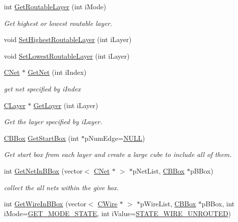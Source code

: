 \begin{DoxyCompactItemize}
int \mbox{\hyperlink{classCDesign_a0612a39d1690b74618229f2b88a8ccb0}{Get\+Routable\+Layer}} (int i\+Mode)
\begin{DoxyCompactList}\small\item\em Get highest or lowest routable layer. \end{DoxyCompactList}\item 
void \mbox{\hyperlink{classCDesign_a4dda519df38cb104e804522f76d826fe}{Set\+Highest\+Routable\+Layer}} (int i\+Layer)
\item 
void \mbox{\hyperlink{classCDesign_af7d386170d501eb471b63b2f663690b0}{Set\+Lowest\+Routable\+Layer}} (int i\+Layer)
\item 
\mbox{\hyperlink{classCNet}{C\+Net}} $\ast$ \mbox{\hyperlink{classCDesign_a88d8a50b50adf87e7d53b52757f5a04c}{Get\+Net}} (int i\+Index)
\begin{DoxyCompactList}\small\item\em get net specified by i\+Index \end{DoxyCompactList}\item 
\mbox{\hyperlink{classCLayer}{C\+Layer}} $\ast$ \mbox{\hyperlink{classCDesign_a33e73f8a75aa2198ff498f7f67633e9a}{Get\+Layer}} (int i\+Layer)
\begin{DoxyCompactList}\small\item\em Get the layer specified by i\+Layer. \end{DoxyCompactList}\item 
\mbox{\hyperlink{classCBBox}{C\+B\+Box}} \mbox{\hyperlink{classCDesign_a8890c8bb8e27692b75d0a68eaa28b885}{Get\+Start\+Box}} (int $\ast$p\+Num\+Edge=\mbox{\hyperlink{BoxRouter_8h_a070d2ce7b6bb7e5c05602aa8c308d0c4}{N\+U\+LL}})
\begin{DoxyCompactList}\small\item\em Get start box from each layer and create a large cube to include all of them. \end{DoxyCompactList}\item 
int \mbox{\hyperlink{classCDesign_a5ab5f93449266153a28914c319626289}{Get\+Net\+In\+B\+Box}} (vector$<$ \mbox{\hyperlink{classCNet}{C\+Net}} $\ast$ $>$ $\ast$p\+Net\+List, \mbox{\hyperlink{classCBBox}{C\+B\+Box}} $\ast$p\+B\+Box)
\begin{DoxyCompactList}\small\item\em collect the all nets within the give box. \end{DoxyCompactList}\item 
int \mbox{\hyperlink{classCDesign_a8c52d3fa7d4b688303cc6b1410c6bc2a}{Get\+Wire\+In\+B\+Box}} (vector$<$ \mbox{\hyperlink{classCWire}{C\+Wire}} $\ast$ $>$ $\ast$p\+Wire\+List, \mbox{\hyperlink{classCBBox}{C\+B\+Box}} $\ast$p\+B\+Box, int i\+Mode=\mbox{\hyperlink{BoxRouter_8h_a6f72f2cc9dd31793dd832ccfb2547de4}{G\+E\+T\+\_\+\+M\+O\+D\+E\+\_\+\+S\+T\+A\+TE}}, int i\+Value=\mbox{\hyperlink{BoxRouter_8h_a853da9235ff1dc45acb5ca9556530d21}{S\+T\+A\+T\+E\+\_\+\+W\+I\+R\+E\+\_\+\+U\+N\+R\+O\+U\+T\+ED}})

\end{DoxyCompactItemize}
